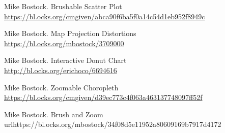 \documentclass[journal]{vgtc}                %
\begin{document}
\begin{thebibliography}{9}
Mike Bostock.
Brushable Scatter Plot
\\\url{https://bl.ocks.org/cmgiven/abca90f6ba5f0a14c54d1eb952f8949c}

Mike Bostock.
Map Projection Distortions
\\\url{https://bl.ocks.org/mbostock/3709000}

Mike Bostock.
Interactive Donut Chart
\\\url{http://bl.ocks.org/erichoco/6694616}

Mike Bostock.
Zoomable Choropleth
\\\url{https://bl.ocks.org/cmgiven/d39ec773c4f063a463137748097ff52f}

Mike Bostock.
Brush and Zoom
\\url{https://bl.ocks.org/mbostock/34f08d5e11952a80609169b7917d4172}

\end{thebibliography}







%

%
%
%


\end{document}
